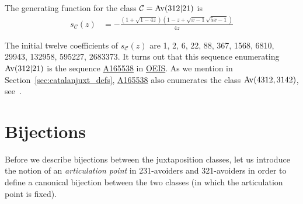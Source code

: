 \documentclass[12pt, a4paper, twoside]{report}
\begin{document}
\begin{theorem}
The generating function for the class $\mathcal{C} = \mathrm{Av}(312|21)$ is
\begin{align*}
s_{\mathcal{C}}(z) &= -\frac{(1+\sqrt{1-4z})(1-z+\sqrt{x-1}\sqrt{5x-1})}{4z}
\end{align*}
\end{theorem}

The initial twelve coefficients of $s_{\mathcal{C}}(z)$ are 1, 2, 6, 22, 88, 367, 1568, 6810, 29943, 132958, 595227, 2683373. It turns out that this sequence enumerating $\mathrm{Av}(312|21)$ is the sequence \href{http://oeis.org/A165538}{A165538} in \href{http://oeis.org/}{OEIS}. As we mention in Section~\ref{sec:catalanjuxt_defs}, \href{http://oeis.org/A165538}{A165538} also enumerates the class $\mathrm{Av}(4312,3142)$, see~\cite{albert2012inflations}.

\section{Bijections}
\label{sec:bijections}
Before we describe bijections between the juxtaposition classes, let us introduce the notion of an \emph{articulation point} in 231-avoiders and 321-avoiders in order to define a canonical bijection between the two classes (in which the articulation point is fixed).
\end{document}
